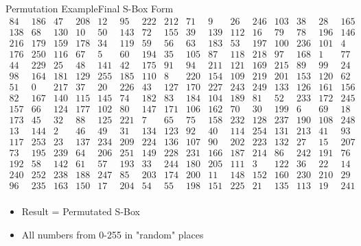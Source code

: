 \documentclass[
	aspectratio=169,	%
	onlytextwidth,		%
	t,					%
	]{beamer}
\begin{document}
\begin{frame}{Permutation Example}{Final S-Box Form}
	\tiny
	\bigskip
	\centering
	$\begin{array}{|cccccccccccccccc|}
		84& 186& 47& 208& 12& 95& 222& 212& 71& 9& 26& 246& 103& 38& 28& 165 \\
		138 & 68 & 130 & 10 & 50 & 143 & 72 & 155 & 39 & 139 & 112 & 16 & 79 & 78 & 196 & 146 \\
		216 & 179 & 159 & 178 & 34 & 119 & 59 & 56 & 63 & 183 & 53 & 197 & 100 & 236 & 101 & 4 \\
		176 & 250 & 116 & 67 & 5 & 60 & 194 & 35 & 105 & 87 & 118 & 218 & 97 & 168 & 1 & 77 \\
		44 & 229 & 25 & 48 & 141 & 42 & 175 & 91 & 94 & 211 & 121 & 169 & 215 & 89 & 99 & 24 \\
		98 & 164 & 181 & 129 & 255 & 185 & 110 & 8 & 220 & 154 & 109 & 219 & 201 & 153 & 120 & 62 \\
		51 & 0 & 217 & 37 & 20 & 226 & 43 & 127 & 170 & 227 & 243 & 249 & 133 & 126 & 161 & 156 \\
		82 & 167 & 140 & 115 & 145 & 74 & 182 & 83 & 184 & 104 & 189 & 81 & 52 & 233 & 172 & 245 \\
		157 & 66 & 124 & 177 & 102 & 80 & 147 & 171 & 106 & 162 & 70 & 30 & 199 & 6 & 69 & 18 \\
		173 & 45 & 32 & 88 & 125 & 221 & 7 & 65 & 75 & 158 & 232 & 128 & 237 & 190 & 108 & 248 \\
		13 & 144 & 2 & 46 & 49 & 31 & 134 & 123 & 92 & 40 & 114 & 254 & 131 & 213 & 41 & 93 \\
		117 & 253 & 23 & 137 & 234 & 209 & 224 & 136 & 107 & 90 & 202 & 223 & 132 & 27 & 15 & 207 \\
		73 & 195 & 239 & 64 & 206 & 251 & 149 & 228 & 231 & 166 & 187 & 214 & 86 & 242 & 191 & 76 \\
		192 & 58 & 142 & 61 & 57 & 193 & 33 & 244 & 180 & 205 & 111 & 3 & 122 & 36 & 22 & 14 \\
		240 & 252 & 238 & 188 & 247 & 85 & 203 & 174 & 200 & 11 & 148 & 152 & 160 & 230 & 210 & 29 \\
		96 & 235 & 163 & 150 & 17 & 204 & 54 & 55 & 198 & 151 & 225 & 21 & 135 & 113 & 19 & 241 \\
	\end{array}$
	\normalsize
	\begin{itemize}
		\item Result = Permutated S-Box
		\item All numbers from 0-255 in "random" places
	\end{itemize}
\end{frame}
\end{document}
